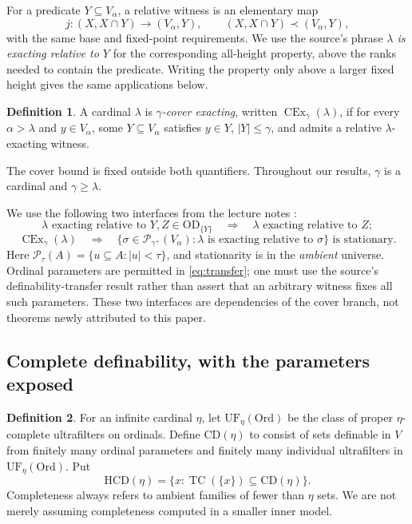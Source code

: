 \documentclass[11pt,letterpaper]{article}
\theoremstyle{definition}
\newtheorem{definition}{Definition}[section]
\newcommand{\OD}{\mathrm{OD}}
\newcommand{\CEx}{\operatorname{CEx}}
\newcommand{\Ord}{\mathrm{Ord}}
\newcommand{\CD}{\mathrm{CD}}
\newcommand{\HCD}{\mathrm{HCD}}
\newcommand{\UF}{\mathrm{UF}}
\newcommand{\TC}{\operatorname{TC}}
\newcommand{\PP}{\mathcal P}
\begin{document}
For a predicate $Y\subseteq V_\alpha$, a relative witness is an elementary map
\[
 j:(X,X\cap Y)\longrightarrow(V_\alpha,Y),
 \qquad (X,X\cap Y)\prec(V_\alpha,Y),
\]
with the same base and fixed-point requirements. We use the source's phrase \emph{$\lambda$ is exacting relative to $Y$} for the corresponding all-height property, above the ranks needed to contain the predicate. Writing the property only above a larger fixed height gives the same applications below.

\begin{definition}\label{def:cover}
A cardinal $\lambda$ is \emph{$\gamma$-cover exacting}, written $\CEx_\gamma(\lambda)$, if for every $\alpha>\lambda$ and $y\in V_\alpha$, some $Y\subseteq V_\alpha$ satisfies $y\in Y$, $|Y|\leq\gamma$, and admits a relative $\lambda$-exacting witness.
\end{definition}

The cover bound is fixed outside both quantifiers. Throughout our results, $\gamma$ is a cardinal and $\gamma\geq\lambda$.

We use the following two interfaces from the lecture notes \cite[Lemma 3.3 and Proposition 3.4]{cover}:
\begin{equation}\label{eq:transfer}
 \lambda\text{ exacting relative to }Y,
 Z\in\OD_{\{Y\}}
 \quad\Longrightarrow\quad
 \lambda\text{ exacting relative to }Z;
\end{equation}
\begin{equation}\label{eq:stationary-interface}
 \CEx_\gamma(\lambda)\quad\Longrightarrow\quad
 \{\sigma\in\PP_{\gamma^+}(V_\alpha):
        \lambda\text{ is exacting relative to }\sigma\}
 \text{ is stationary.}
\end{equation}
Here $\PP_\tau(A)=\{u\subseteq A:|u|<\tau\}$, and stationarity is in the \emph{ambient} universe. Ordinal parameters are permitted in \eqref{eq:transfer}; one must use the source's definability-transfer result rather than assert that an arbitrary witness fixes all such parameters. These two interfaces are dependencies of the cover branch, not theorems newly attributed to this paper.

\subsection{Complete definability, with the parameters exposed}

\begin{definition}\label{def:CD}
For an infinite cardinal $\eta$, let $\UF_\eta(\Ord)$ be the class of proper $\eta$-complete ultrafilters on ordinals. Define $\CD(\eta)$ to consist of sets definable in $V$ from finitely many ordinal parameters and finitely many individual ultrafilters in $\UF_\eta(\Ord)$. Put
\[
 \HCD(\eta)=\{x:\TC(\{x\})\subseteq\CD(\eta)\}.
\]
Completeness always refers to ambient families of fewer than $\eta$ sets. We are not merely assuming completeness computed in a smaller inner model.
\end{definition}
\end{document}
